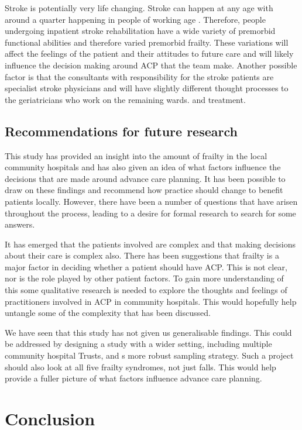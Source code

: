 \documentclass
[
	12pt,
	a4paper,
	oneside,
]{report}
\begin{document}
Stroke is potentially very life changing. Stroke can happen at any age with 
around a quarter happening in people of working age \parencite{stroke:18}. 
Therefore, people undergoing 
inpatient stroke rehabilitation have a wide variety of premorbid functional 
abilities and therefore varied premorbid frailty. These variations will
affect the feelings of the patient and their attitudes to future care and will
likely influence the decision making around ACP that the team make. Another
possible factor is that the consultants with responsibility for the stroke 
patients are specialist stroke physicians and will have slightly different 
thought processes to the geriatricians who work on the remaining wards.
and treatment.

\section{Recommendations for future research}

This study has provided an insight into the amount of frailty in the local
community hospitals and has also given an idea of what factors influence the 
decisions that are made around advance care planning. It has been possible to
draw on these findings and recommend how practice should change to benefit
patients locally. However, there have been a number of questions that have 
arisen throughout the process, leading to a desire for formal research to 
search for some answers. 

It has emerged that the patients involved are complex and that making decisions
about their care is complex also. There has been suggestions that frailty is 
a major factor in deciding whether a patient should have ACP. This is not
clear, nor is the role played by other patient factors. To gain more 
understanding of this some qualitative research is needed 
to explore the thoughts and feelings of practitioners involved in ACP in
community hospitals. This would hopefully help untangle some of the complexity
that has been discussed.

We have seen that this study has not given us generalisable findings. This
could be addressed by designing a study with a wider setting, including
multiple community hospital Trusts, and s more robust sampling strategy. 
Such a project should
also look at all five frailty syndromes, not just falls. This would help
provide a fuller picture of what factors influence advance care planning.

\chapter{Conclusion}
\end{document}
